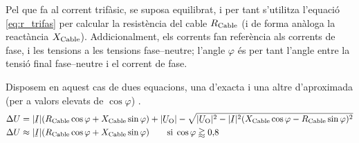 Pel que fa al corrent trif\`{a}sic, se suposa equilibrat, i per tant s'utilitza l'equaci\'{o}
\eqref{eq:r_trifas} per calcular la resist\`{e}ncia del cable $R_\mathrm{Cable}$ (i de forma
an\`{a}loga la react\`{a}ncia $X_\mathrm{Cable}$). Addicionalment, els corrents fan refer\`{e}ncia als
corrents de fase, i les tensions a les tensions fase--neutre; l'angle $\varphi$ \'{e}s per
tant l'angle entre la tensi\'{o} final fase--neutre i el corrent de fase.

Disposem en aquest cas de dues equacions, una d'exacta i una altre d'aproximada (per a valors elevats de $\cos \varphi$) .
\begin{subequations}
\begin{align}
   \Delta U &= |\cmplx{I}| ( R\ped{Cable} \cos \varphi + X\ped{Cable} \sin \varphi) + |\cmplx{U}\ped{O}| - \sqrt{|\cmplx{U}\ped{O}|^2 - |\cmplx{I}|^2 ( X\ped{Cable} \cos \varphi - R\ped{Cable} \sin \varphi )^2} \label{eq:cdt_trif_exact} \\
   \Delta U &\approx |\cmplx{I}| ( R\ped{Cable} \cos \varphi + X\ped{Cable} \sin \varphi) \qquad \text{si} \; \cos \varphi \gtrapprox 0{,}8 \label{eq:cdt_trif_aprox}
\end{align}
\end{subequations}

